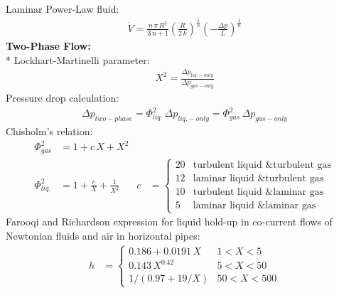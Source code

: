 \begin{datasheet}
Laminar Power-Law fluid:
\begin{align*}
  \dot{V} = \frac{n\,\pi\,R^3}{3\,n+1} \left(\frac{R}{2\,k}\right)^{\frac{1}{n}} \left(-\frac{\Delta p}{L}\right)^{\frac{1}{n}}
\end{align*}
{\bf Two-Phase Flow:}\\*
Lockhart-Martinelli parameter:
\begin{align*}
  X^2=\frac{\Delta p_{liq.-only}}{\Delta p_{gas-only}}
\end{align*}
Pressure drop calculation:
\begin{align*}
  \Delta p_{two-phase} = \Phi^2_{liq.}\,\Delta p_{liq.-only} = \Phi^2_{gas}\,\Delta p_{gas-only}
\end{align*}
Chisholm's relation:
\begin{align*}
  \Phi^2_{gas} &= 1 + c\,X + X^2 &\\
  \Phi^2_{liq.} &= 1 + \frac{c}{X}+\frac{1}{X^2} &
  c &= \begin{cases}
    20& \text{turbulent liquid \& turbulent gas}\\
    12& \text{laminar liquid \& turbulent gas}\\
    10& \text{turbulent liquid \& laminar gas}\\
    5& \text{laminar liquid \& laminar gas}
  \end{cases}
\end{align*}
Farooqi and Richardson expression for liquid hold-up in co-current
flows of Newtonian fluids and air in horizontal pipes:
\begin{align*}
  h &=
  \begin{cases}
    0.186+0.0191\,X & 1 < X < 5\\
    0.143\,X^{0.42} & 5 < X < 50\\
    1/\left(0.97 + 19/X\right) & 50 < X < 500
  \end{cases}
\end{align*}


\end{datasheet}
